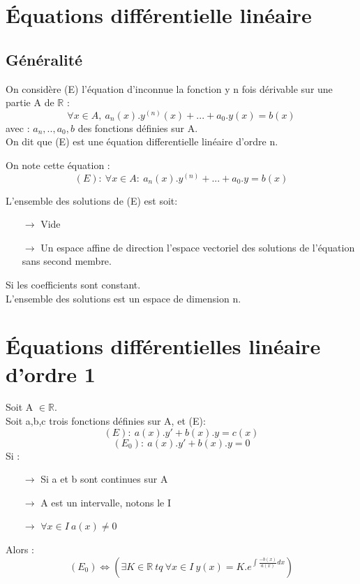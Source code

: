 \chapter{Équations différentielle linéaire}
\section{Généralité}
\begin{de}
On considère (E) l'équation d'inconnue la fonction y n fois dérivable sur une partie A de $\mathbb{R}$ :
$$\forall x \in A,~ a_n(x).y^{(n)}(x)+...+a_0.y(x) = b(x)$$
avec : $a_n,..,a_0,b$ des fonctions définies sur A.\\
On dit que (E) est une équation differentielle linéaire d'ordre n.
\end{de}
\begin{nota}
On note cette équation : 
$$(E) :~ \forall x \in A :~  a_n(x).y^{(n)}+...+a_0.y = b(x)$$
\end{nota}
\begin{prop}
L'ensemble des solutions de (E) est soit:
\begin{itemize}
 \item[$\rightarrow$] Vide
 \item[$\rightarrow$] Un espace affine de direction l'espace vectoriel des solutions de l'équation sans second membre.\\
\end{itemize}
Si les coefficients sont constant.\\
L'ensemble des solutions est un espace de dimension n. 
\end{prop}
\chapter{Équations différentielles linéaire d'ordre 1}
\begin{de}
Soit A $\in \mathbb{R}$.\\
Soit a,b,c trois fonctions définies sur A, et (E):
$$(E) :~ a(x).y' + b(x).y = c(x)$$
$$(E_0) :~ a(x).y' + b(x).y = 0$$
Si :
\begin{itemize}
 \item[$\rightarrow$] Si a et b sont continues sur A
 \item[$\rightarrow$] A est un intervalle, notons le I
 \item[$\rightarrow$] $\forall x \in I~ a(x) \neq 0$
\end{itemize}
Alors : 
$$(E_0) \Leftrightarrow (\exists K \in \mathbb{R}~ tq~ \forall x \in I~ y(x)=K.e^{\int \frac{-b(x)}{a(x)}dx})$$
\end{de}
